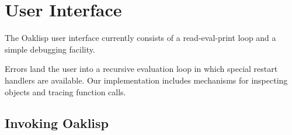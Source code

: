 %
%
%


\chapter{User Interface} \label{user}

The Oaklisp user interface currently consists of a read-eval-print
loop and a simple debugging facility.

Errors land the user into a recursive evaluation loop in which special
restart handlers are available.  Our implementation includes
mechanisms for inspecting objects and tracing function calls.


\section{Invoking Oaklisp} \label{sec:invoking}

